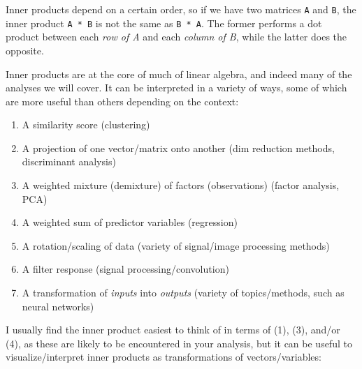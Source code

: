 \documentclass[11pt]{article}
\providecommand{\tightlist}{%
      \setlength{\itemsep}{0pt}\setlength{\parskip}{0pt}}
\begin{document}
Inner products depend on a certain order, so if we have two matrices
\texttt{A} and \texttt{B}, the inner product \texttt{A\ *\ B} is not the
same as \texttt{B\ *\ A}. The former performs a dot product between each
\emph{row of A} and each \emph{column of B}, while the latter does the
opposite.

Inner products are at the core of much of linear algebra, and indeed
many of the analyses we will cover. It can be interpreted in a variety
of ways, some of which are more useful than others depending on the
context:

\begin{enumerate}
\def\labelenumi{\arabic{enumi}.}
\tightlist
\item
  A similarity score (clustering)
\item
  A projection of one vector/matrix onto another (dim reduction methods,
  discriminant analysis)
\item
  A weighted mixture (demixture) of factors (observations) (factor
  analysis, PCA)
\item
  A weighted sum of predictor variables (regression)
\item
  A rotation/scaling of data (variety of signal/image processing
  methods)
\item
  A filter response (signal processing/convolution)
\item
  A transformation of \emph{inputs} into \emph{outputs} (variety of
  topics/methods, such as neural networks)
\end{enumerate}

I usually find the inner product easiest to think of in terms of (1),
(3), and/or (4), as these are likely to be encountered in your analysis,
but it can be useful to visualize/interpret inner products as
transformations of vectors/variables:
\end{document}
